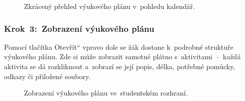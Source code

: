 \documentclass[male,czech,api_bc]{kitheses}
\begin{document}
\begin{figure}[H]
	\centering
	\caption{Zkrácený přehled výukového plánu v~pohledu kalendář.}
	\label{fig:manual-10}
\end{figure}

\subsubsection{Krok~3:~Zobrazení výukového plánu}
Pomocí tlačítka \quotedblbase Otevřít`` vpravo dole se žák dostane k~podrobné struktuře výukového plánu. Zde si může zobrazit samotné plátno s~aktivitami~--~každá aktivita se dá rozkliknout a~zobrazí se její popis, délka, potřebné pomůcky, odkazy či přiložené soubory.

\begin{figure}[H]
	\centering
	\caption{Zobrazení výukového plánu ve~studentském rozhraní.}
	\label{fig:manual-11}
\end{figure}
\end{document}
